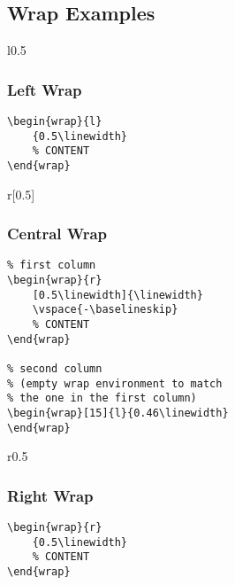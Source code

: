 \documentclass[itdr]{subfiles}
\begin{document}
\clearpage

\subsection{Wrap Examples}

\begin{wrap}{l}{0.5\linewidth}
\vspace{-\baselineskip}
\subsubsection{Left Wrap}
\begin{lstlisting}
\begin{wrap}{l}
	{0.5\linewidth}
	% CONTENT
\end{wrap}
\end{lstlisting}
\end{wrap}

\lipsum[1]

\begin{wrap}{r}[0.5\linewidth]{\linewidth}
\vspace{-\baselineskip}
\subsubsection{Central Wrap}
\begin{lstlisting}
% first column
\begin{wrap}{r}
	[0.5\linewidth]{\linewidth}
	\vspace{-\baselineskip}
	% CONTENT
\end{wrap}

% second column
% (empty wrap environment to match
% the one in the first column)
\begin{wrap}[15]{l}{0.46\linewidth}
\end{wrap}
\end{lstlisting}
\end{wrap}

\skipline
\lipsum[2]

\skipline
\lipsum[3]

\begin{wrap}{r}{0.5\linewidth}
\vspace{-\baselineskip}
\subsubsection{Right Wrap}
\begin{lstlisting}
\begin{wrap}{r}
	{0.5\linewidth}
	% CONTENT
\end{wrap}
\end{lstlisting}
\end{wrap}
\end{document}
